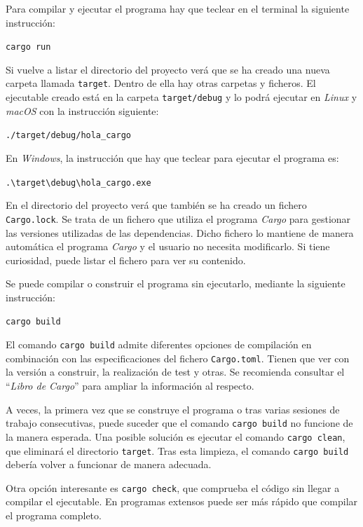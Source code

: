 Para compilar y ejecutar el programa hay que teclear en el terminal la siguiente instrucción:

{\centering\texttt{cargo run}\par}

Si vuelve a listar el directorio del proyecto verá que se ha creado una nueva carpeta llamada \texttt{target}. Dentro de ella hay otras carpetas y ficheros. El ejecutable creado está en la carpeta \texttt{target/debug} y lo podrá ejecutar en \textit{Linux} y \textit{macOS} con la instrucción siguiente:

{\centering\texttt{./target/debug/hola\_cargo}\par}

En \textit{Windows}, la instrucción que hay que teclear para ejecutar el programa es:

{\centering\texttt{.\textbackslash target\textbackslash debug\textbackslash hola\_cargo.exe}\par}

En el directorio del proyecto verá que también se ha creado un fichero \texttt{Cargo.lock}. Se trata de un fichero que utiliza el programa \textit{Cargo} para gestionar las versiones utilizadas de las dependencias. Dicho fichero lo mantiene de manera automática el programa \textit{Cargo} y el usuario no necesita modificarlo. Si tiene curiosidad, puede listar el fichero para ver su contenido.

Se puede compilar o construir el programa sin ejecutarlo, mediante la siguiente instrucción:

{\centering\texttt{cargo build}\par}

El comando \texttt{cargo build} admite diferentes opciones de compilación en combinación con las especificaciones del fichero \texttt{Cargo.toml}. Tienen que ver con la versión a construir, la realización de test y otras. Se recomienda consultar el ``\textit{Libro de Cargo}'' \citep{CargoBook} para ampliar la información al respecto.

A veces, la primera vez que se construye el programa o tras varias sesiones de trabajo consecutivas, puede suceder que el comando \texttt{cargo build} no funcione de la manera esperada. Una posible solución es ejecutar el comando \texttt{cargo clean}, que eliminará el directorio \texttt{target}. Tras esta limpieza, el comando \texttt{cargo build} debería volver a funcionar de manera adecuada.

Otra opción interesante es \texttt{cargo check}, que comprueba el código sin llegar a compilar el ejecutable. En programas extensos puede ser más rápido que compilar el programa completo.

